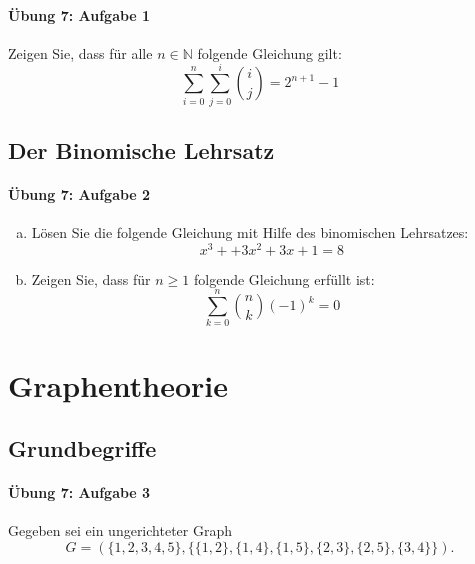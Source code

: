 \documentclass
[
  draft    = true,
  fontsize = 11pt,
  parskip  = half-,
  BCOR     = 0pt,
  DIV      = 11,
  ngerman,
  dvipsnames
]
{scrartcl}
\begin{document}
\paragraph{Übung 7: Aufgabe 1}
Zeigen Sie, dass für alle $n\in\mathbb{N}$ folgende Gleichung gilt:
\begin{equation*}
  \sum_{i=0}^{n}\sum_{j=0}^{i}\binom{i}{j}=2^{n+1}-1
\end{equation*}

\subsection{Der Binomische Lehrsatz}

\paragraph{Übung 7: Aufgabe 2}
\begin{enumerate}[a)]
  \item Lösen Sie die folgende Gleichung mit Hilfe des binomischen Lehrsatzes:
        \begin{equation*}
          x^3++3x^2+3x+1=8
        \end{equation*}
  \item Zeigen Sie, dass für $n\geq1$ folgende Gleichung erfüllt ist:
        \begin{equation*}
          \sum_{k=0}^{n}\binom{n}{k}(-1)^k=0
        \end{equation*}
\end{enumerate}

\section{Graphentheorie}

\subsection{Grundbegriffe}

\paragraph{Übung 7: Aufgabe 3}
Gegeben sei ein ungerichteter Graph
\begin{equation*}
  G=(\{1,2,3,4,5\},\{\{1,2\},\{1,4\},\{1,5\},\{2,3\},\{2,5\},\{3,4\}\}).
\end{equation*}
\end{document}
